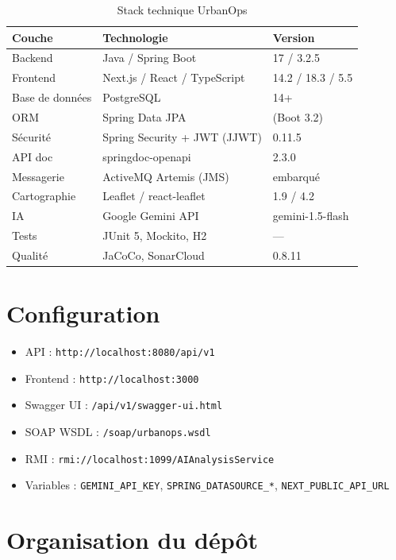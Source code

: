 \documentclass[12pt,a4paper,oneside]{report}
\begin{document}
\begin{table}[H]
  \centering
  \caption{Stack technique UrbanOps}
  \label{tab:stack}
  \begin{tabular}{@{}lll@{}}
    \toprule
    \textbf{Couche} & \textbf{Technologie} & \textbf{Version} \\
    \midrule
    Backend & Java / Spring Boot & 17 / 3.2.5 \\
    Frontend & Next.js / React / TypeScript & 14.2 / 18.3 / 5.5 \\
    Base de données & PostgreSQL & 14+ \\
    ORM & Spring Data JPA & (Boot 3.2) \\
    Sécurité & Spring Security + JWT (JJWT) & 0.11.5 \\
    API doc & springdoc-openapi & 2.3.0 \\
    Messagerie & ActiveMQ Artemis (JMS) & embarqué \\
    Cartographie & Leaflet / react-leaflet & 1.9 / 4.2 \\
    IA & Google Gemini API & gemini-1.5-flash \\
    Tests & JUnit 5, Mockito, H2 & --- \\
    Qualité & JaCoCo, SonarCloud & 0.8.11 \\
    \bottomrule
  \end{tabular}
\end{table}

\section{Configuration}

\begin{itemize}[leftmargin=*]
  \item API : \texttt{http://localhost:8080/api/v1}
  \item Frontend : \texttt{http://localhost:3000}
  \item Swagger UI : \texttt{/api/v1/swagger-ui.html}
  \item SOAP WSDL : \texttt{/soap/urbanops.wsdl}
  \item RMI : \texttt{rmi://localhost:1099/AIAnalysisService}
  \item Variables : \texttt{GEMINI\_API\_KEY}, \texttt{SPRING\_DATASOURCE\_*}, \texttt{NEXT\_PUBLIC\_API\_URL}
\end{itemize}

\section{Organisation du dépôt}
\end{document}
